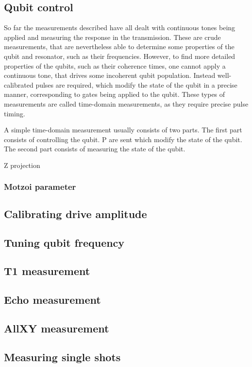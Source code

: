 \documentclass[12pt]{report}
\begin{document}
      \subsection{Qubit control}
        So far the measurements described have all dealt with continuous tones being applied and measuring the response in the transmission. These are crude measurements, that are nevertheless able to determine some properties of the qubit and resonator, such as their frequencies. However, to find more detailed properties of the qubits, such as their coherence times, one cannot apply a continuous tone, that drives some incoherent qubit population. Instead well-calibrated pulses are required, which modify the state of the qubit in a precise manner, corresponding to gates being applied to the qubit. These types of measurements are called time-domain measurements, as they require precise pulse timing.

        A simple time-domain measurement usually consists of two parts. The first part consists of controlling the qubit. P are sent which modify the state of the qubit. The second part consists of measuring the state of the qubit.

        Z projection






        \subsubsection{Motzoi parameter}
      \subsection{Calibrating drive amplitude}
      \subsection{Tuning qubit frequency}
      \subsection{T1 measurement}
      \subsection{Echo measurement}
      \subsection{AllXY measurement}
      \subsection{Measuring single shots}
\end{document}
